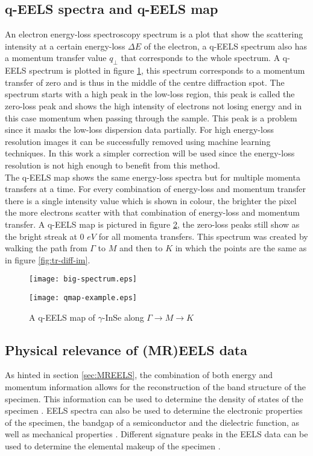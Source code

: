 \subsection{q-EELS spectra and q-EELS map}
An electron energy-loss spectroscopy spectrum is a plot that show the scattering intensity at a certain energy-loss $\Delta E$ of the electron, a q-EELS spectrum also has a momentum transfer value $q_{\perp}$ that corresponds to the whole spectrum. A q-EELS spectrum is plotted in figure \ref{fig:spectrum}, this spectrum corresponds to a momentum transfer of zero and is thus in the middle of the centre diffraction spot. The spectrum starts with a high peak in the low-loss region, this peak is called the zero-loss peak and shows the high intensity of electrons not losing energy and in this case momentum when passing through the sample. This peak is a problem since it masks the low-loss dispersion data partially. For high energy-loss resolution images it can be successfully removed using machine learning techniques.\cite{ROEST2021113202} In this work a simpler correction will be used since the energy-loss resolution is not high enough to benefit from this method.\\
The q-EELS map shows the same energy-loss spectra but for multiple momenta transfers at a time. For every combination of energy-loss and momentum transfer there is a single intensity value which is shown in colour, the brighter the pixel the more electrons scatter with that combination of energy-loss and momentum transfer. A q-EELS map is pictured in figure \ref{fig:qmap}, the zero-loss peaks still show as the bright streak at $0$ $eV$ for all momenta transfers. This spectrum was created by walking the path from $\Gamma$ to $M$ and then to $K$ in which the points are the same as in figure \ref{fig:tr-diff-im}.
%
\begin{figure}[H]
	\centering
	\captionsetup{width=0.9\linewidth}
	\texttt{[image: big-spectrum.eps]}
	\label{fig:spectrum}
\end{figure}
%
\begin{figure}[H]
	\centering
	\captionsetup{width=0.9\linewidth}
	\texttt{[image: qmap-example.eps]}
	\caption{A q-EELS map of $\gamma$-InSe along $\Gamma \rightarrow M \rightarrow K$}
	\label{fig:qmap}
\end{figure}
%
\subsection{Physical relevance of (MR)EELS data}
As hinted in section \ref{sec:MREELS}, the combination of both energy and momentum information allows for the reconstruction of the band structure of the specimen. This information can be used to determine the density of states of the specimen \cite{doi:10.1021/acs.nanolett.9b03928} \cite{Egerton_2008}.
EELS spectra can also be used to determine the electronic properties of the specimen, the bandgap of a semiconductor and the dielectric function, as well as mechanical properties \cite{Egerton_2008}.
Different signature peaks in the EELS data can be used to determine the elemental makeup of the specimen \cite{Egerton_2008}.
